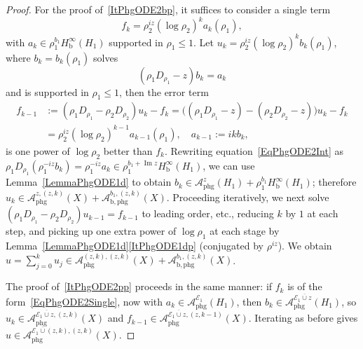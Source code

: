 \documentclass[reqno,11pt,letterpaper]{amsart}
\numberwithin{equation}{section}
\numberwithin{figure}{section}
\theoremstyle{definition}
\theoremstyle{remark}
\newcommand{\mc}{\mathcal}
\newcommand{\cA}{\mc A}
\newcommand{\cE}{\mc E}
\renewcommand{\Im}{\operatorname{Im}}
\newcommand{\extcup}{\operatorname{\ol\cup}}
\newcommand{\ol}{\overline}
\newcommand{\bop}{{\mathrm{b}}}
\newcommand{\Hb}{H_{\bop}}
\newcommand{\phg}{{\mathrm{phg}}}
\begin{document}
\begin{proof}
  For the proof of~\eqref{ItPhgODE2bp}, it suffices to consider a single term
  \begin{equation}
  \label{EqPhgODE2Single}
    f_k=\rho_2^{i z}(\log\rho_2)^k a_k(\rho_1),
  \end{equation}
  with $a_k\in\rho_1^{b_1}\Hb^\infty(H_1)$ supported in $\rho_1\leq 1$. Let $u_k=\rho_2^{i z}(\log\rho_2)^k b_k(\rho_1)$, where $b_k=b_k(\rho_1)$ solves
  \begin{equation}
  \label{EqPhgODE2Int}
    (\rho_1 D_{\rho_1}-z)b_k=a_k
  \end{equation}
  and is supported in $\rho_1\leq 1$, then the error term
  \begin{align*}
    f_{k-1} &:= (\rho_1 D_{\rho_1}-\rho_2 D_{\rho_2})u_k-f_k = \bigl((\rho_1 D_{\rho_1}-z)-(\rho_2 D_{\rho_2}-z)\bigr)u_k-f_k \\
      &= \rho_2^{i z}(\log\rho_2)^{k-1}a_{k-1}(\rho_1),\quad a_{k-1}:=i k b_k,
  \end{align*}
  is one power of $\log\rho_2$ better than $f_k$. Rewriting equation~\eqref{EqPhgODE2Int} as $\rho_1 D_{\rho_1}(\rho_1^{-i z}b_k)=\rho_1^{-i z}a_k\in\rho_1^{b_1+\Im z}\Hb^\infty(H_1)$, we can use Lemma~\ref{LemmaPhgODE1d} to obtain $b_k\in \cA_\phg^z(H_1)+\rho_1^{b_1}\Hb^\infty(H_1)$; therefore $u_k\in\cA_\phg^{z,(z,k)}(X)+\cA_{\bop,\phg}^{b_1,(z,k)}(X)$. Proceeding iteratively, we next solve $(\rho_1 D_{\rho_1}-\rho_2 D_{\rho_2})u_{k-1}=f_{k-1}$ to leading order, etc., reducing $k$ by $1$ at each step, and picking up one extra power of $\log\rho_1$ at each stage by Lemma~\ref{LemmaPhgODE1d}\eqref{ItPhgODE1dp} (conjugated by $\rho^{i z}$). We obtain $u=\sum_{j=0}^k u_j\in\cA_\phg^{(z,k),(z,k)}(X)+\cA_{\bop,\phg}^{b_1,(z,k)}(X)$.

  The proof of~\eqref{ItPhgODE2pp} proceeds in the same manner: if $f_k$ is of the form~\eqref{EqPhgODE2Single}, now with $a_k\in\cA_\phg^{\cE_1}(H_1)$, then $b_k\in\cA_\phg^{\cE_1\extcup z}(H_1)$, so $u_k\in\cA_\phg^{\cE_1\extcup z,(z,k)}(X)$ and $f_{k-1}\in\cA_\phg^{\cE_1\extcup z,(z,k-1)}(X)$. Iterating as before gives $u\in\cA_\phg^{\cE_1\extcup(z,k),(z,k)}(X)$.
\end{proof}
\end{document}
